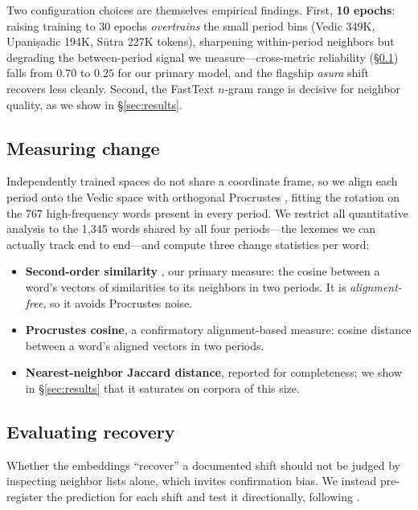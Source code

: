 Two configuration choices are themselves empirical findings. First, \textbf{10 epochs}: raising
training to 30 epochs \emph{overtrains} the small period bins (Vedic 349K, Upani\d{s}adic 194K,
S\=utra 227K tokens), sharpening within-period neighbors but degrading the between-period signal
we measure---cross-metric reliability (\S\ref{sec:change}) falls from $0.70$ to $0.25$ for our
primary model, and the flagship \textit{asura} shift recovers less cleanly. Second, the FastText
$n$-gram range is decisive for neighbor quality, as we show in \S\ref{sec:results}.

\subsection{Measuring change}
\label{sec:change}
Independently trained spaces do not share a coordinate frame, so we align each period onto the
Vedic space with orthogonal Procrustes \citep{hamilton2016}, fitting the rotation on the 767
high-frequency words present in every period. We restrict all quantitative analysis to the
1{,}345 words shared by all four periods---the lexemes we can actually track end to end---and
compute three change statistics per word:

\begin{itemize}\setlength{\itemsep}{1pt}
  \item \textbf{Second-order similarity} \citep{hamilton2016b}, our primary measure: the cosine
        between a word's vectors of similarities to its neighbors in two periods. It is
        \emph{alignment-free}, so it avoids Procrustes noise.
  \item \textbf{Procrustes cosine}, a confirmatory alignment-based measure: cosine distance
        between a word's aligned vectors in two periods.
  \item \textbf{Nearest-neighbor Jaccard distance}, reported for completeness; we show in
        \S\ref{sec:results} that it saturates on corpora of this size.
\end{itemize}

\subsection{Evaluating recovery}
\label{sec:recovery}
Whether the embeddings ``recover'' a documented shift should not be judged by inspecting neighbor
lists alone, which invites confirmation bias. We instead pre-register the prediction for each
shift and test it directionally, following \citet{hamilton2016}.

